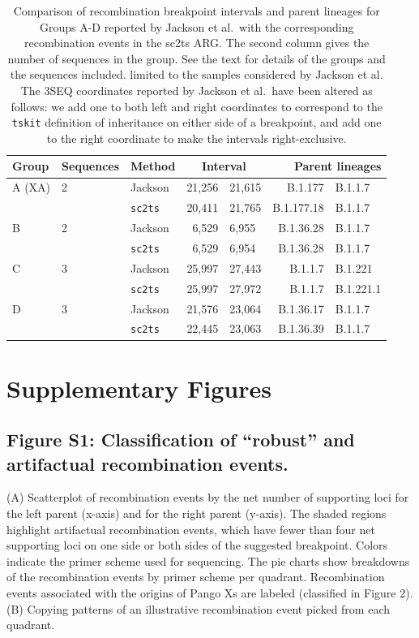 \documentclass[12pt,letterpaper]{article}
\begin{document}
\begin{table} \centering
\caption{\label{tab:jackson}Comparison of recombination breakpoint
intervals and parent lineages for Groups A-D
reported by Jackson et al.\ with the corresponding
recombination events in the sc2ts ARG.
The second column gives the number of sequences in the group.
See the text for details of the groups and the sequences included.
limited to the samples considered by Jackson et al.
The 3SEQ coordinates
reported by Jackson et al.\ have been altered as follows: we
add one to both left and right coordinates to correspond to the
\texttt{tskit} definition of inheritance on either side of a breakpoint,
and add one to the right coordinate to make the intervals
right-exclusive. }
\begin{tabular}{lllr@{--}lr@{+}l}
\toprule
Group        & Sequences & Method & \multicolumn{2}{c}{Interval}
    & \multicolumn{2}{r}{Parent lineages} \\
\midrule
A (XA)       & 2   & Jackson        &  21,256&21,615 & B.1.177&B.1.1.7 \\
             &     &\texttt{sc2ts} &  20,411&21,765 & B.1.177.18&B.1.1.7 \\
\cmidrule{3-7}
B            & 2   & Jackson        &  6,529&6,955 & B.1.36.28&B.1.1.7  \\
             &     &\texttt{sc2ts} &   6,529&6,954 & B.1.36.28&B.1.1.7  \\
\cmidrule{3-7}
C            & 3   &Jackson         &  25,997&27,443 &  B.1.1.7&B.1.221 \\
             &     & \texttt{sc2ts} &  25,997&27,972 &  B.1.1.7&B.1.221.1 \\
\cmidrule{3-7}
D            & 3   & Jackson        &  21,576&23,064 &  B.1.36.17&B.1.1.7 \\
             &     & \texttt{sc2ts} &  22,445&23,063 &  B.1.36.39&B.1.1.7 \\
\bottomrule
\end{tabular}
\end{table}


\section*{Supplementary Figures}

\subsection*{Figure S1: Classification of “robust” and artifactual recombination events.}
(A) Scatterplot of recombination events by the net number of supporting loci for the left parent (x-axis) and for the right parent (y-axis).
The shaded regions highlight artifactual recombination events,
which have fewer than four net supporting loci on one side or both sides of the suggested breakpoint.
Colors indicate the primer scheme used for sequencing.
The pie charts show breakdowns of the recombination events by primer scheme per quadrant.
Recombination events associated with the origins of Pango Xs are labeled (classified in Figure 2).
(B) Copying patterns of an illustrative recombination event picked from each quadrant.
\end{document}

